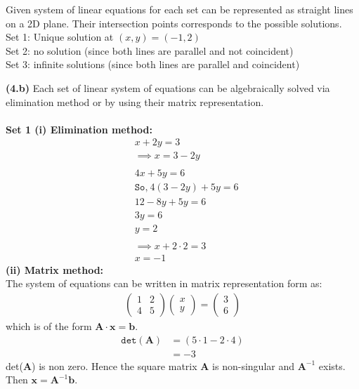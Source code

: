 \documentclass[12pt,letterpaper,fleqn]{article}
\theoremstyle{definition}
\begin{document}
	Given system of linear equations for each set can be represented
	as straight lines on a 2D plane. Their intersection points corresponds to the possible solutions.\\
	Set 1: Unique solution at $(x,y) = (-1, 2)$\\
	Set 2: no solution (since both lines are parallel and not coincident)\\
	Set 3: infinite solutions (since both lines are parallel and coincident)\\

\newpage

\textbf{(4.b)} Each set of linear system of equations can be algebraically solved via elimination method or by using their matrix representation.\\
\\	
	\textbf{Set 1 (i) Elimination method:}
	\begin{equation*}
	\begin{split}
	&x + 2y = 3\\
	&\implies x = 3 -2y\\
	\\
	&4x + 5y = 6\\
	&\texttt{So,}~4(3- 2y) + 5y = 6\\
	&12 - 8y + 5y = 6\\
	&3y = 6 \\
	&y = 2\\
	\\
	&\implies x + 2\cdot 2 = 3\\
	&x = -1 
	\end{split}
	\end{equation*}
	\textbf{ (ii) Matrix method:}\\
	The system of equations can be written in matrix representation form as:
	\begin{equation*}
	\begin{split}
	\begin{pmatrix}
	1 &2\\
	4 &5
	\end{pmatrix}
	\begin{pmatrix}
	x\\
	y
	\end{pmatrix} =
	\begin{pmatrix}
	3\\
	6
	\end{pmatrix}
	\end{split}
	\end{equation*}
	which is of the form $\textbf{A}\cdot \textbf{x} = \textbf{b}$.
	\begin{equation*}
	\begin{split}
	\texttt{det}(\textbf{A}) &= ( 5 \cdot 1 - 2 \cdot 4 )\\
	&= -3
	\end{split}
	\end{equation*}
	det(\textbf{A}) is non zero. Hence the square matrix \textbf{A} is non-singular and $\textbf{A}^{-1}$ exists.\\
	Then $\textbf{x} = \textbf{A}^{-1}\textbf{b}$.
	
\end{document}
